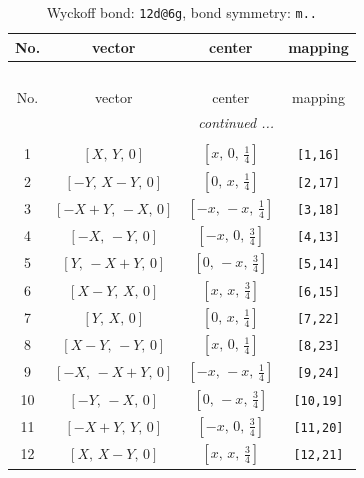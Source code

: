 \documentclass[fleqn,8pt]{jsarticle}
\begin{document}
\begin{longtable}{cccc}
\caption{Wyckoff bond: {\tt 12d@6g}, bond symmetry: {\tt m..}}
 \\
 \hline \hline
No. & vector & center & mapping \\ \hline \endfirsthead

\multicolumn{3}{l}{\tablename\ \thetable{}} \\
 \hline \hline
No. & vector & center & mapping \\ \hline \endhead

 \hline \hline
\multicolumn{3}{r}{\footnotesize\it continued ...} \\ \endfoot

 \hline \hline
\multicolumn{3}{r}{} \\ \endlastfoot

1 & $\left[ X,\, Y,\, 0 \right]$ & $\left[ x,\, 0,\, \frac{1}{4} \right]$ & {\tt [1,16]} \\ \hline
2 & $\left[ - Y,\, X - Y,\, 0 \right]$ & $\left[ 0,\, x,\, \frac{1}{4} \right]$ & {\tt [2,17]} \\ \hline
3 & $\left[ - X + Y,\, - X,\, 0 \right]$ & $\left[ - x,\, - x,\, \frac{1}{4} \right]$ & {\tt [3,18]} \\ \hline
4 & $\left[ - X,\, - Y,\, 0 \right]$ & $\left[ - x,\, 0,\, \frac{3}{4} \right]$ & {\tt [4,13]} \\ \hline
5 & $\left[ Y,\, - X + Y,\, 0 \right]$ & $\left[ 0,\, - x,\, \frac{3}{4} \right]$ & {\tt [5,14]} \\ \hline
6 & $\left[ X - Y,\, X,\, 0 \right]$ & $\left[ x,\, x,\, \frac{3}{4} \right]$ & {\tt [6,15]} \\ \hline
7 & $\left[ Y,\, X,\, 0 \right]$ & $\left[ 0,\, x,\, \frac{1}{4} \right]$ & {\tt [7,22]} \\ \hline
8 & $\left[ X - Y,\, - Y,\, 0 \right]$ & $\left[ x,\, 0,\, \frac{1}{4} \right]$ & {\tt [8,23]} \\ \hline
9 & $\left[ - X,\, - X + Y,\, 0 \right]$ & $\left[ - x,\, - x,\, \frac{1}{4} \right]$ & {\tt [9,24]} \\ \hline
10 & $\left[ - Y,\, - X,\, 0 \right]$ & $\left[ 0,\, - x,\, \frac{3}{4} \right]$ & {\tt [10,19]} \\ \hline
11 & $\left[ - X + Y,\, Y,\, 0 \right]$ & $\left[ - x,\, 0,\, \frac{3}{4} \right]$ & {\tt [11,20]} \\ \hline
12 & $\left[ X,\, X - Y,\, 0 \right]$ & $\left[ x,\, x,\, \frac{3}{4} \right]$ & {\tt [12,21]} \\
\end{longtable}
\end{document}
